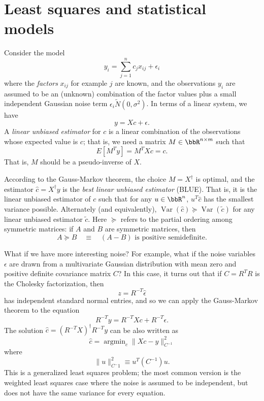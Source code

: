 \section{Least squares and statistical models}

Consider the model
\[
  y_i = \sum_{j=1}^n c_j x_{ij} + \epsilon_i
\]
where the {\em factors} $x_{ij}$ for example $j$ are known,
and the observations $y_i$ are assumed to be an (unknown)
combination of the factor values plus a small independent
Gaussian noise term $\epsilon_i \tilde N(0,\sigma^2)$.
In terms of a linear system, we have
\[
  y = X c + \epsilon.
\]
A {\em linear unbiased estimator} for $c$ is a linear combination
of the observations whose expected value is $c$; that is, we
need a matrix $M \in \bbR^{n \times m}$ such that
\[
  E[M^T y] = M^T X c = c.
\]
That is, $M$ should be a pseudo-inverse of $X$.

According to the Gauss-Markov theorem, the choice $M = X^\dagger$
is optimal, and the estimator $\hat{c} = X^\dagger y$
is the {\em best linear unbiased estimator} (BLUE).  That is,
it is the linear unbiased estimator of $c$ such that for any
$u \in \bbR^n$,  $u^T \hat{c}$ has the smallest variance possible.
Alternately (and equivalently),
$\operatorname{Var}(\hat{c}) \succeq \operatorname{Var}(\tilde{c})$
for any linear unbiased estimator $\tilde{c}$.  Here $\succeq$ refers
to the partial ordering among symmetric matrices: if $A$ and $B$
are symmetric matrices, then
\[
  A \succeq B \quad \equiv \quad (A-B) \mbox{ is positive semidefinite}.
\]

What if we have more interesting noise?  For example, what if the
noise variables $\epsilon$ are drawn from a multivariate Gaussian
distribution with mean zero and positive definite covariance matrix $C$?
In this case, it turns out that if $C = R^T R$ is the
Cholesky factorization, then
\[
  z = R^{-T} \hat{\epsilon}
\]
has independent standard normal entries, and so we can apply
the Gauss-Markov theorem to the equation
\[
  R^{-T} y = R^{-T} X c + R^{-T} \epsilon.
\]
The solution $\hat{c} = (R^{-T} X)^{\dagger} R^{-T} y$ can be also
written as
\[
  \hat{c} = \operatorname{argmin}_c \|Xc-y\|^2_{C^{-1}}
\]
where
\[
  \|u\|_{C^-1}^2 \equiv u^T (C^{-1}) u.
\]
This is a generalized least squares problem; the most common version
is the weighted least squares case where the noise is assumed to
be independent, but does not have the same variance for every equation.
